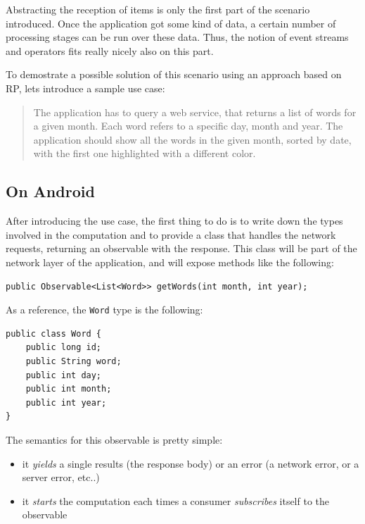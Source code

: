 Abstracting the reception of items is only the first part of the
scenario introduced. Once the application got some kind of data, a
certain number of processing stages can be run over these data. Thus,
the notion of event streams and operators fits really nicely also on
this part.

To demostrate a possible solution of this scenario using an approach
based on RP, lets introduce a sample use case:

\begin{quote}
The application has to query a web service, that returns a list of words
for a given month. Each word refers to a specific day, month and year.
The application should show all the words in the given month, sorted by
date, with the first one highlighted with a different color.
\end{quote}

\subsection{On Android}\label{on-android}

After introducing the use case, the first thing to do is to write down
the types involved in the computation and to provide a class that
handles the network requests, returning an observable with the response.
This class will be part of the network layer of the application, and
will expose methods like the following:

\begin{verbatim}
public Observable<List<Word>> getWords(int month, int year);
\end{verbatim}

As a reference, the \texttt{Word} type is the following:

\begin{verbatim}
public class Word {
    public long id;
    public String word;
    public int day;
    public int month;
    public int year;
}
\end{verbatim}

The semantics for this observable is pretty simple:

\begin{itemize}
\itemsep1pt\parskip0pt
\item
  it \emph{yields} a single results (the response body) or an error (a
  network error, or a server error, etc..)
\item
  it \emph{starts} the computation each times a consumer
  \emph{subscribes} itself to the observable
\end{itemize}

